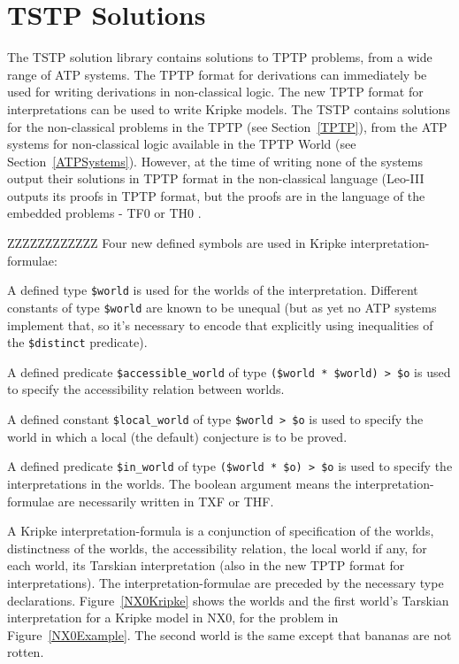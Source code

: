 \documentclass[runningheads]{llncs}
\newenvironment{packed_itemize}{
\vspace*{-0.5em}
\begin{itemize}
\setlength{\partopsep}{0pt}
\setlength{\itemsep}{1pt}
\setlength{\parskip}{0pt}
\setlength{\parsep}{0pt}
}{\end{itemize}}
\begin{document}
\section{TSTP Solutions}
\label{TSTP}

The TSTP solution library \cite{Sut07-CSR} contains solutions to TPTP problems, from a wide range
of ATP systems.
The TPTP format for derivations \cite{SS+06} can immediately be used for writing derivations in
non-classical logic.
The new TPTP format for interpretations \cite{SS+23-LPAR} can be used to write Kripke models.
The TSTP contains solutions for the non-classical problems in the TPTP (see Section~\ref{TPTP}), 
from the ATP systems for non-classical logic available in the TPTP World (see
Section~\ref{ATPSystems}).
However, at the time of writing none of the systems output their solutions in TPTP format in
the non-classical language (Leo-III outputs its proofs in TPTP format, but the proofs are
in the language of the embedded problems - TF0 or TH0 \cite{SS+23}.

ZZZZZZZZZZZZ
Four new defined symbols are used in Kripke interpretation-formulae:
\begin{packed_itemize}
\item A defined type {\tt \$world} is used for the worlds of the interpretation.
      Different constants of type {\tt \$world} are known to be unequal (but as yet no ATP 
      systems implement that, so it's necessary to encode that explicitly using inequalities of 
      the {\tt \$distinct} predicate).
\item A defined predicate {\tt \$accessible\_world} of type {\tt (\$world~*~\$world)~>~\$o}
      is used to specify the accessibility relation between worlds.
\item A defined constant {\tt \$local\_world} of type {\tt \$world~>~\$o} is used to specify 
      the world in which a local (the default) conjecture is to be proved. 
\item A defined predicate {\tt \$in\_world} of type {\tt (\$world~*~\$o)~>~\$o} is used to 
      specify the interpretations in the worlds.
      The boolean argument means the interpretation-formulae are necessarily written in TXF or THF.
\end{packed_itemize}
A Kripke interpretation-formula is a conjunction of specification of the worlds,
distinctness of the worlds,
the accessibility relation,
the local world if any,
for each world, its Tarskian interpretation (also in the new TPTP format for interpretations).
The interpretation-formulae are preceded by the necessary type declarations.
Figure~\ref{NX0Kripke} shows the worlds and the first world's Tarskian interpretation for 
a Kripke model in NX0, for the problem in Figure~\ref{NX0Example}.
The second world is the same except that bananas are not rotten.
\end{document}
